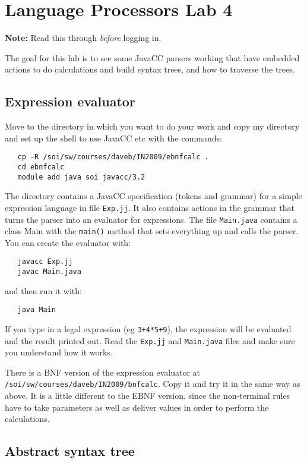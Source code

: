 \documentclass{article}
\begin{document}
\thispagestyle{empty}

\section*{Language Processors Lab 4}

{\bf Note:} Read this through {\em before\/} logging in.

\medskip\noindent The goal for this
lab is to see some JavaCC parsers working 
that have embedded actions to do
calculations and build syntax trees, 
and how to traverse the trees. 


\subsection*{Expression evaluator}

Move to the directory in which you want to do
your work and copy my directory and set up the shell to 
use JavaCC etc with the commands:
\begin{verbatim}
   cp -R /soi/sw/courses/daveb/IN2009/ebnfcalc .
   cd ebnfcalc
   module add java soi javacc/3.2
\end{verbatim}
The directory contains a JavaCC specification (tokens and grammar) 
for a simple expression language in file \verb+Exp.jj+. 
It also contains actions in the grammar that turns the parser
into an evaluator for expressions.
The file \verb+Main.java+ contains a class Main 
with the \verb+main()+ method that sets 
everything up and calls the parser. 
You can create the evaluator with:
\begin{verbatim}
   javacc Exp.jj
   javac Main.java
\end{verbatim}
and then run it with:
\begin{verbatim}
   java Main
\end{verbatim}
If you type in a legal expression (eg \verb=3+4*5+9=), the expression
will be evaluated and the result printed out.
Read the \verb+Exp.jj+ and \verb+Main.java+ files and make sure
you understand how it works.

There is a BNF version of the expression evaluator at
\verb+/soi/sw/courses/daveb/IN2009/bnfcalc+. Copy it
and try it in the same way as above. It is a little different 
to the EBNF version, since the non-terminal rules have to take
parameters as well as deliver values in order to perform
the calculations.

\subsection*{Abstract syntax tree}
\end{document}
